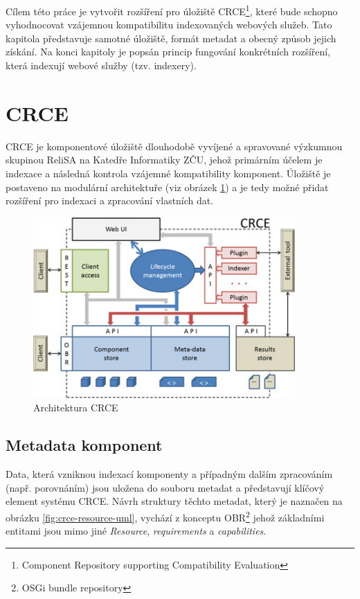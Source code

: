 \documentclass[czech,DP]{thesiskiv}
\begin{document}
Cílem této práce je vytvořit rozšíření pro úložiště CRCE\footnote{Component Repository supporting Compatibility Evaluation}, které bude schopno vyhodnocovat vzájemnou kompatibilitu indexovaných webových služeb. Tato kapitola představuje samotné úložiště, formát metadat a obecný způsob jejich získání. Na konci kapitoly je popsán princip fungování konkrétních rozšíření, která indexují webové služby (tzv. indexery).

\section{CRCE}

CRCE je komponentové úložiště dlouhodobě vyvíjené a spravované výzkumnou skupinou ReliSA na Katedře Informatiky ZČU, jehož primárním účelem je indexace a následná kontrola vzájemné kompatibility komponent. Úložiště je postaveno na modulární architektuře (viz obrázek \ref{fig:crce-arch}) a je tedy možné přidat rozšíření pro indexaci a zpracování vlastních dat.

\begin{figure}[h]
	\centering
	\includegraphics[width=10cm]{crce-arch.jpg}
	\caption{Architektura CRCE}
	\label{fig:crce-arch}
\end{figure} 

\subsection{Metadata komponent}
\label{subsec:crce-metadata}

Data, která vzniknou indexací komponenty a případným dalším zpracováním (např. porovnáním) jsou uložena do souboru metadat a představují klíčový element systému CRCE. Návrh struktury  těchto metadat, který je naznačen na obrázku \ref{fig:crce-resource-uml}, vychází z konceptu OBR\footnote{OSGi bundle repository} jehož základními entitami jsou mimo jiné \textit{Resource}, \textit{requirements} a \textit{capabilities}\cite{brada2015repository}. 
\end{document}

